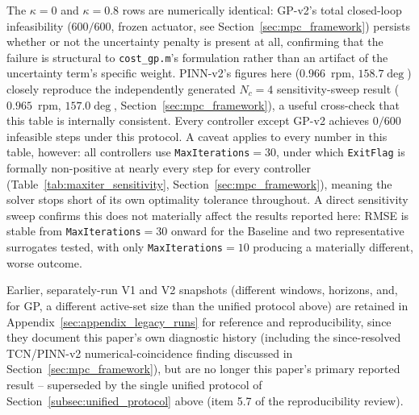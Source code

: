 \hspace{1.5cm} The $\kappa=0$ and $\kappa=0.8$ rows are numerically identical: GP-v2's
total closed-loop infeasibility ($600/600$, frozen actuator, see
Section~\ref{sec:mpc_framework}) persists whether or not the
uncertainty penalty is present at all, confirming that the failure is
structural to \texttt{cost\_gp.m}'s formulation rather than an
artifact of the uncertainty term's specific weight. PINN-v2's figures
here ($0.966$~rpm, $158.7\deg$) closely reproduce the independently
generated $N_c=4$ sensitivity-sweep result ($0.965$~rpm, $157.0\deg$,
Section~\ref{sec:mpc_framework}), a useful cross-check that this table
is internally consistent. Every controller except GP-v2 achieves
$0/600$ infeasible steps under this protocol. A caveat applies to
every number in this table, however: all controllers use
\texttt{MaxIterations}$=30$, under which \texttt{ExitFlag} is
formally non-positive at nearly every step for every controller
(Table~\ref{tab:maxiter_sensitivity}, Section~\ref{sec:mpc_framework}),
meaning the solver stops short of its own optimality tolerance
throughout. A direct sensitivity sweep confirms this does not
materially affect the results reported here: RMSE is stable from
\texttt{MaxIterations}$=30$ onward for the Baseline and two
representative surrogates tested, with only
\texttt{MaxIterations}$=10$ producing a materially different, worse
outcome.


\hspace{1.5cm} Earlier, separately-run V1 and V2 snapshots (different windows,
horizons, and, for GP, a different active-set size than the unified
protocol above) are retained in Appendix~\ref{sec:appendix_legacy_runs}
for reference and reproducibility, since they document this paper's
own diagnostic history (including the since-resolved TCN/PINN-v2
numerical-coincidence finding discussed in
Section~\ref{sec:mpc_framework}), but are no longer this paper's
primary reported result -- superseded by the single unified protocol
of Section~\ref{subsec:unified_protocol} above (item 5.7 of the
reproducibility review).